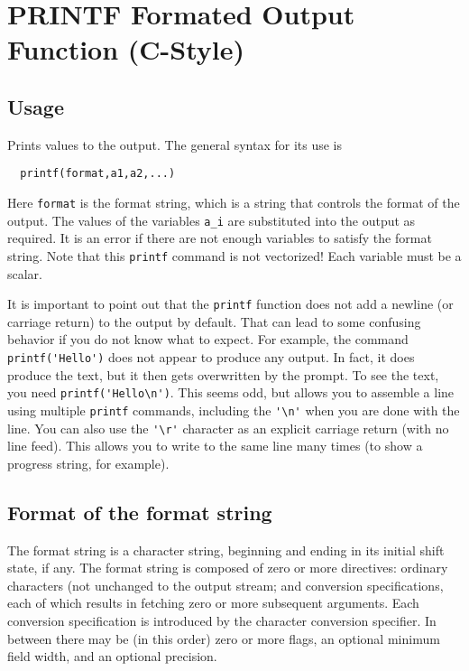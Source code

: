 \section{PRINTF Formated Output Function (C-Style)}

\subsection{Usage}

Prints values to the output.  The general syntax for its use is
\begin{verbatim}
  printf(format,a1,a2,...)
\end{verbatim}
Here \verb|format| is the format string, which is a string that
controls the format of the output.  The values of the variables
\verb|a_i| are substituted into the output as required.  It is
an error if there are not enough variables to satisfy the format
string.  Note that this \verb|printf| command is not vectorized!  Each
variable must be a scalar.

It is important to point out that the \verb|printf| function does not
add a newline (or carriage return) to the output by default.  That
can lead to some confusing behavior if you do not know what to expect.
For example, the command \verb|printf('Hello')| does not appear to
produce any output.  In fact, it does produce the text, but it then
gets overwritten by the prompt.  To see the text, you need 
\verb|printf('Hello\n')|.  This seems odd, but allows you to assemble a
line using multiple \verb|printf| commands, including the \verb|'\n'| when
you are done with the line.  You can also use the \verb|'\r'| character
as an explicit carriage return (with no line feed).  This allows you
to write to the same line many times (to show a progress string, for
example).

\subsection{Format of the format string}


The  format  string  is a character string, beginning and ending in its
initial shift state, if any.  The format string is composed of zero  or
more   directives:  ordinary  characters  (not  %
unchanged to the output stream; and conversion specifications, each  of
which results in fetching zero or more subsequent arguments.  Each 
conversion specification is introduced by the character %
conversion  specifier.  In between there may be (in this order) zero or
more flags, an optional minimum field width, and an optional precision.

